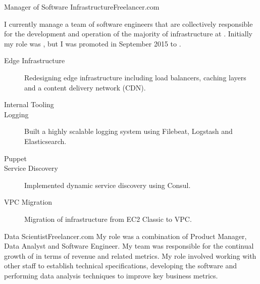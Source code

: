 \begin{professionalExperience}

{Manager of Software Infrastructure}{Freelancer.com}
{
  I currently manage a team of software engineers that are collectively
  responsible for the development and operation of the majority of
  infrastructure at . Initially my role was
  , but I was promoted in September
  2015 to .

  \begin{description}
    \item[Edge Infrastructure] Redesigning edge infrastructure including load
      balancers, caching layers and a content delivery network (CDN).
    \item[Internal Tooling]
    \item[Logging] Built a highly scalable logging system using Filebeat,
      Logstash and Elasticsearch.
    \item[Puppet]
    \item[Service Discovery] Implemented dynamic service discovery using Consul.
    \item[VPC Migration] Migration of infrastructure from EC2 Classic to VPC.
  \end{description}
}

{Data Scientist}{Freelancer.com}
{My role was a combination of Product Manager, Data Analyst and Software
Engineer. My team was responsible for the continual growth of
 in terms of revenue and related metrics. My role
involved working with other staff to establish technical specifications,
developing the software and performing data analysis techniques to improve key
business metrics.}

\end{professionalExperience}
